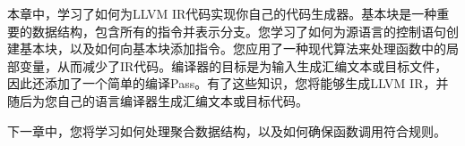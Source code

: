 本章中，学习了如何为LLVM IR代码实现你自己的代码生成器。基本块是一种重要的数据结构，包含所有的指令并表示分支。您学习了如何为源语言的控制语句创建基本块，以及如何向基本块添加指令。您应用了一种现代算法来处理函数中的局部变量，从而减少了IR代码。编译器的目标是为输入生成汇编文本或目标文件，因此还添加了一个简单的编译Pass。有了这些知识，您将能够生成LLVM IR，并随后为您自己的语言编译器生成汇编文本或目标代码。\par

下一章中，您将学习如何处理聚合数据结构，以及如何确保函数调用符合规则。\par

\newpage